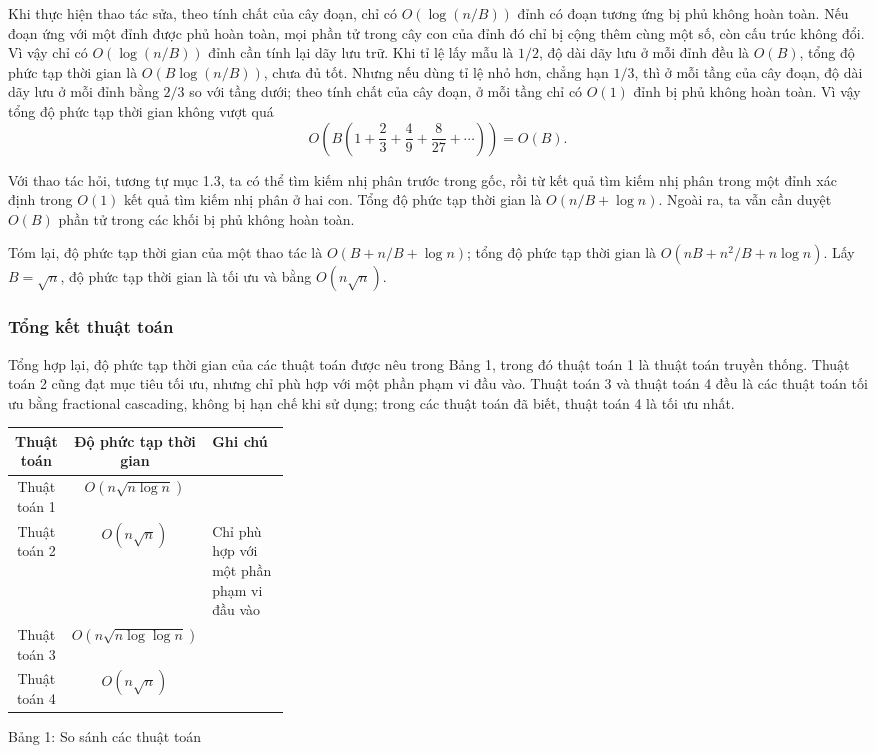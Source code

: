 \documentclass[11pt]{article}
\begin{document}
Khi thực hiện thao tác sửa, theo tính chất của cây đoạn, chỉ có $O(\log(n/B))$
đỉnh có đoạn tương ứng bị phủ không hoàn toàn. Nếu đoạn ứng với một đỉnh được
phủ hoàn toàn, mọi phần tử trong cây con của đỉnh đó chỉ bị cộng thêm cùng một
số, còn cấu trúc không đổi. Vì vậy chỉ có $O(\log(n/B))$ đỉnh cần tính lại dãy
lưu trữ. Khi tỉ lệ lấy mẫu là $1/2$, độ dài dãy lưu ở mỗi đỉnh đều là $O(B)$,
tổng độ phức tạp thời gian là $O(B\log(n/B))$, chưa đủ tốt. Nhưng nếu dùng tỉ
lệ nhỏ hơn, chẳng hạn $1/3$, thì ở mỗi tầng của cây đoạn, độ dài dãy lưu ở mỗi
đỉnh bằng $2/3$ so với tầng dưới; theo tính chất của cây đoạn, ở mỗi tầng chỉ
có $O(1)$ đỉnh bị phủ không hoàn toàn. Vì vậy tổng độ phức tạp thời gian không
vượt quá
\[
O\left(B\left(1+\frac23+\frac49+\frac8{27}+\cdots\right)\right)=O(B).
\]

Với thao tác hỏi, tương tự mục 1.3, ta có thể tìm kiếm nhị phân trước trong
gốc, rồi từ kết quả tìm kiếm nhị phân trong một đỉnh xác định trong $O(1)$ kết
quả tìm kiếm nhị phân ở hai con. Tổng độ phức tạp thời gian là $O(n/B+\log n)$.
Ngoài ra, ta vẫn cần duyệt $O(B)$ phần tử trong các khối bị phủ không hoàn toàn.

Tóm lại, độ phức tạp thời gian của một thao tác là $O(B+n/B+\log n)$; tổng độ
phức tạp thời gian là $O(nB+n^2/B+n\log n)$. Lấy $B=\sqrt n$, độ phức tạp thời
gian là tối ưu và bằng $O(n\sqrt n)$.

\subsubsection{Tổng kết thuật toán}

Tổng hợp lại, độ phức tạp thời gian của các thuật toán được nêu trong Bảng 1,
trong đó thuật toán 1 là thuật toán truyền thống. Thuật toán 2 cũng đạt mục
tiêu tối ưu, nhưng chỉ phù hợp với một phần phạm vi đầu vào. Thuật toán 3 và
thuật toán 4 đều là các thuật toán tối ưu bằng fractional cascading, không bị
hạn chế khi sử dụng; trong các thuật toán đã biết, thuật toán 4 là tối ưu nhất.

\begin{center}
\begin{tabular}{c c p{0.32\linewidth}}
\textbf{Thuật toán} & \textbf{Độ phức tạp thời gian} & \textbf{Ghi chú} \\
\hline
Thuật toán 1 & $O(n\sqrt{n\log n})$ & \\
Thuật toán 2 & $O(n\sqrt n)$ & Chỉ phù hợp với một phần phạm vi đầu vào \\
Thuật toán 3 & $O(n\sqrt{n\log\log n})$ & \\
Thuật toán 4 & $O(n\sqrt n)$ &
\end{tabular}

Bảng 1: So sánh các thuật toán
\end{center}
\end{document}
